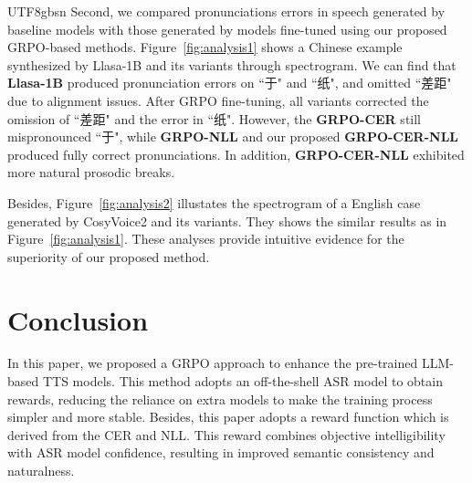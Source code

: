 \documentclass{article}
\begin{document}
\begin{CJK}{UTF8}{gbsn} %
Second, we compared pronunciations errors in speech generated by baseline models with those generated by models fine-tuned using our proposed GRPO-based methods.
Figure~\ref{fig:analysis1} shows a Chinese example synthesized by Llasa-1B and its variants through spectrogram. We can find that \textbf{Llasa-1B} produced pronunciation errors on ``于" and ``纸", and omitted ``差距" due to alignment issues. After GRPO fine-tuning, all variants corrected the omission of ``差距" and the error in ``纸". However, the \textbf{GRPO-CER} still mispronounced ``于", while \textbf{GRPO-NLL} and our proposed \textbf{GRPO-CER-NLL} produced fully correct pronunciations. In addition, \textbf{GRPO-CER-NLL} exhibited more natural prosodic breaks.

Besides, Figure~\ref{fig:analysis2} illustates the spectrogram of a English case generated by CosyVoice2 and its variants. They shows the similar results as in Figure~\ref{fig:analysis1}.
These analyses provide intuitive evidence for the superiority of our proposed method.
\end{CJK}






\vspace{-0.4cm}
\section{Conclusion}
\label{sec:conclusion}
\vspace{-0.2cm}
In this paper, we proposed a GRPO approach to enhance the pre-trained LLM-based TTS models. This method adopts an off-the-shell ASR model to obtain rewards, reducing the reliance on extra models to make the training process simpler and more stable. Besides, this paper adopts a reward function which is derived from the CER and NLL. This reward combines objective intelligibility with ASR model confidence, resulting in improved semantic consistency and naturalness.






\end{document}
